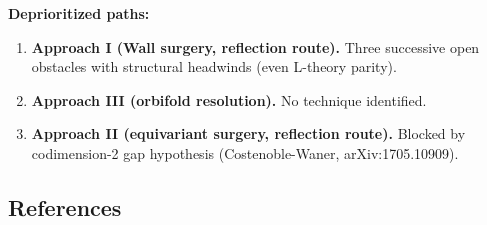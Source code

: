 \textbf{Deprioritized paths:}

\begin{enumerate}
\def\labelenumi{\arabic{enumi}.}
\setcounter{enumi}{2}
\item
  \textbf{Approach I (Wall surgery, reflection route).} Three successive open
  obstacles with structural headwinds (even L-theory parity).
\item
  \textbf{Approach III (orbifold resolution).} No technique identified.
\item
  \textbf{Approach II (equivariant surgery, reflection route).} Blocked by
  codimension-2 gap hypothesis (Costenoble-Waner, arXiv:1705.10909).
\end{enumerate}

\hypertarget{references}{%
\subsection{References}\label{references}}

